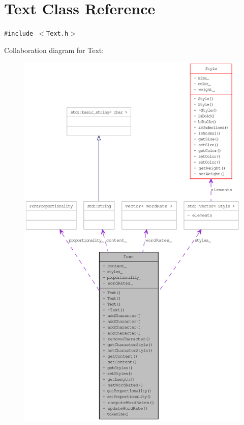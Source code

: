 \hypertarget{class_text}{
\section{Text Class Reference}
\label{class_text}
}
{\tt \#include $<$Text.h$>$}

Collaboration diagram for Text:\nopagebreak
\begin{figure}[H]
\begin{center}
\leavevmode
\includegraphics[width=400pt]{class_text__coll__graph}
\end{center}
\end{figure}


